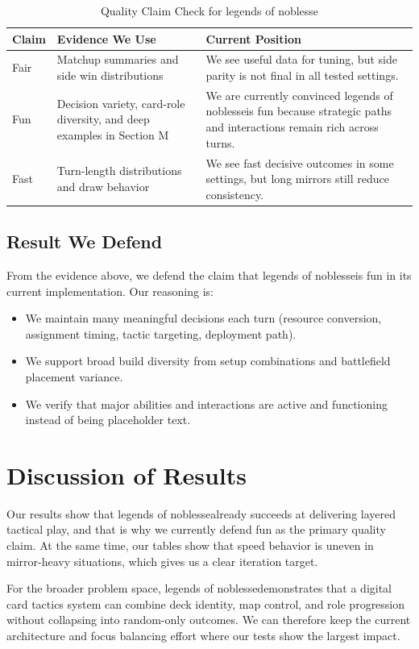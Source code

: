 \documentclass[12pt]{article}
\newcommand{\GameName}{legends of noblesse}
\begin{document}
\begin{table}[H]
\centering
\caption{Quality Claim Check for \GameName}
\label{tab:quality-check}
\begin{tabular}{|p{2.4cm}|p{4.2cm}|p{5.8cm}|}
\hline
\textbf{Claim} & \textbf{Evidence We Use} & \textbf{Current Position} \\
\hline
Fair & Matchup summaries and side win distributions & We see useful data for tuning, but side parity is not final in all tested settings. \\
\hline
Fun & Decision variety, card-role diversity, and deep examples in Section M & We are currently convinced \GameName is fun because strategic paths and interactions remain rich across turns. \\
\hline
Fast & Turn-length distributions and draw behavior & We see fast decisive outcomes in some settings, but long mirrors still reduce consistency. \\
\hline
\end{tabular}
\end{table}

\subsection{Result We Defend}
From the evidence above, we defend the claim that \GameName is fun in its current implementation. Our reasoning is:
\begin{itemize}
    \item We maintain many meaningful decisions each turn (resource conversion, assignment timing, tactic targeting, deployment path).
    \item We support broad build diversity from setup combinations and battlefield placement variance.
    \item We verify that major abilities and interactions are active and functioning instead of being placeholder text.
\end{itemize}

\section{Discussion of Results}
Our results show that \GameName already succeeds at delivering layered tactical play, and that is why we currently defend fun as the primary quality claim. At the same time, our tables show that speed behavior is uneven in mirror-heavy situations, which gives us a clear iteration target.

For the broader problem space, \GameName demonstrates that a digital card tactics system can combine deck identity, map control, and role progression without collapsing into random-only outcomes. We can therefore keep the current architecture and focus balancing effort where our tests show the largest impact.
\end{document}
